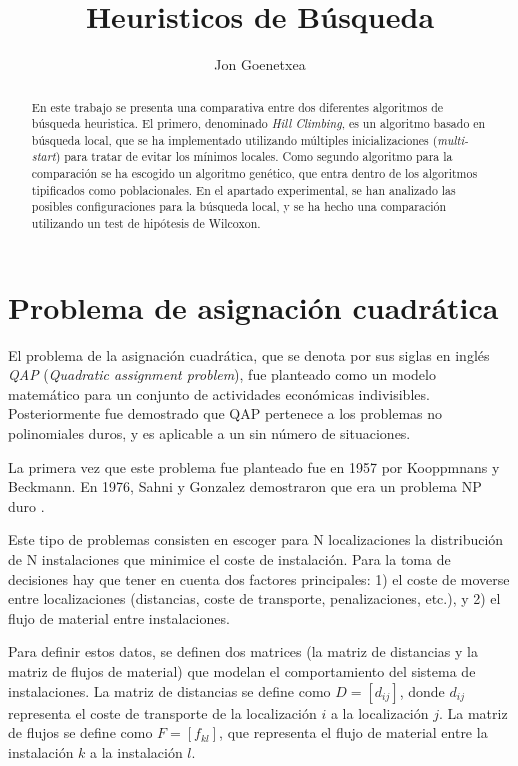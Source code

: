 \documentclass[10pt,a4paper]{article}
\author{Jon Goenetxea}
\title{Heuristicos de Búsqueda}
\begin{document}
\maketitle

\begin{abstract}
En este trabajo se presenta una comparativa entre dos diferentes algoritmos de búsqueda heuristica. El primero, denominado \textit{Hill Climbing}, es un algoritmo basado en búsqueda local, que se ha implementado utilizando múltiples inicializaciones (\textit{multi-start}) para tratar de evitar los mínimos locales. Como segundo algoritmo para la comparación se ha escogido un algoritmo genético, que entra dentro de los algoritmos tipificados como poblacionales. En el apartado experimental, se han analizado las posibles configuraciones para la búsqueda local, y se ha hecho una comparación utilizando un test de hipótesis de Wilcoxon.
\end{abstract}

\section{Problema de asignación cuadrática}
\label{sec:planteamiento}
El problema de la asignación cuadrática, que se denota por sus siglas en inglés \textit{QAP} (\textit{Quadratic assignment problem}), fue planteado como un modelo matemático para un conjunto de actividades económicas indivisibles. Posteriormente fue demostrado que QAP pertenece a los problemas no polinomiales duros, y es aplicable a un sin número de situaciones.

La primera vez que este problema fue planteado fue en 1957 por Kooppmnans y Beckmann. En 1976, Sahni y Gonzalez demostraron que era un problema NP duro 
.

Este tipo de problemas consisten en escoger para N localizaciones la distribución de N instalaciones que minimice el coste de instalación. Para la toma de decisiones hay que tener en cuenta dos factores principales: 1) el coste de moverse entre localizaciones (distancias, coste de transporte, penalizaciones, etc.), y 2) el flujo de material entre instalaciones.

Para definir estos datos, se definen dos matrices (la matriz de distancias y la matriz de flujos de material) que modelan el comportamiento del sistema de instalaciones. La matriz de distancias se define como $D=[d_{ij}]$, donde $d_{ij}$ representa el coste de transporte de la localización $i$ a la localización $j$. La matriz de flujos se define como $F=[f_{kl}]$, que representa el flujo de material entre la instalación $k$ a la instalación $l$.
\end{document}
